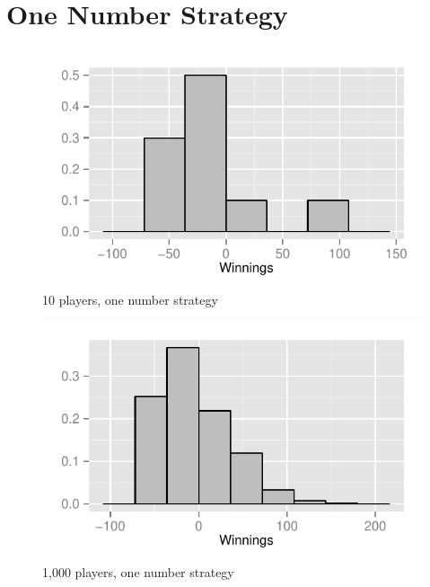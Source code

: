 \documentclass[landscape]{exam}
\begin{document}
  \section{One Number Strategy} %
  
  \begin{figure}[H]
    \centering
    \includegraphics[scale = 0.9]{figures/roulette/1_10_50_fraction.pdf}
    \caption{10 players, one number strategy}
  \end{figure}

  \begin{figure}[H]
    \centering
    \includegraphics[scale = 0.9]{figures/roulette/1_1000_50_fraction.pdf}
    \caption{1,000 players, one number strategy}
  \end{figure}
\end{document}
